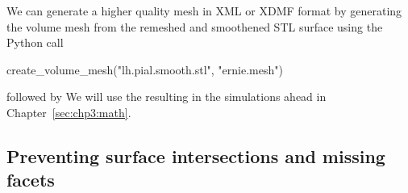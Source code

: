We can generate a higher quality mesh in XML or XDMF format by
generating the volume mesh from the remeshed and smoothened STL
surface using the Python call
\begin{python}
create_volume_mesh("lh.pial.smooth.stl", "ernie.mesh")
\end{python}
followed by
\noindent We will use the resulting  in the
simulations ahead in Chapter~\ref{sec:chp3:math}.

\subsection{Preventing surface intersections and missing facets}
\label{subsec:chp3:preventing-surface-intersections}


